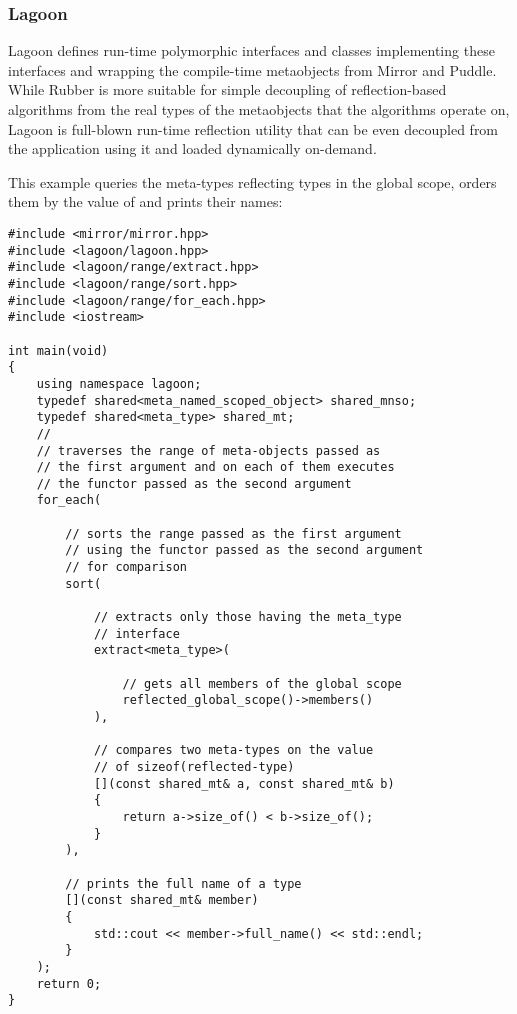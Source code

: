 \subsubsection{Lagoon}

Lagoon defines run-time polymorphic interfaces and classes implementing these
interfaces and wrapping the compile-time metaobjects from Mirror and Puddle.
While Rubber is more suitable for simple decoupling of reflection-based
algorithms from the real types of the metaobjects that the algorithms
operate on, Lagoon is full-blown run-time reflection utility that can be
even decoupled from the application using it and loaded dynamically on-demand.

This example queries the meta-types reflecting types in the global scope,
orders them by the value of \verb@sizeof@ and prints their names:

\begin{lstlisting}
#include <mirror/mirror.hpp>
#include <lagoon/lagoon.hpp>
#include <lagoon/range/extract.hpp>
#include <lagoon/range/sort.hpp>
#include <lagoon/range/for_each.hpp>
#include <iostream>

int main(void)
{
    using namespace lagoon;
    typedef shared<meta_named_scoped_object> shared_mnso;
    typedef shared<meta_type> shared_mt;
    //
    // traverses the range of meta-objects passed as
    // the first argument and on each of them executes
    // the functor passed as the second argument
    for_each(

        // sorts the range passed as the first argument
        // using the functor passed as the second argument
        // for comparison
        sort(

            // extracts only those having the meta_type
            // interface
            extract<meta_type>(

                // gets all members of the global scope
                reflected_global_scope()->members()
            ),

            // compares two meta-types on the value
            // of sizeof(reflected-type)
            [](const shared_mt& a, const shared_mt& b)
            {
                return a->size_of() < b->size_of();
            }
        ),

        // prints the full name of a type
        [](const shared_mt& member)
        {
            std::cout << member->full_name() << std::endl;
        }
    );
    return 0;
}
\end{lstlisting}

